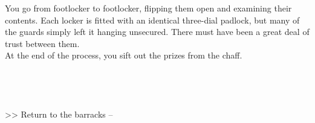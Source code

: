 You go from footlocker to footlocker, flipping them open and examining their contents. Each locker is fitted with an identical three-dial padlock, but many of the guards simply left it hanging unsecured. There must have been a great deal of trust between them.\\

At the end of the process, you sift out the prizes from the chaff.\\
\\
\\
\\
\\

>> Return to the barracks -- 